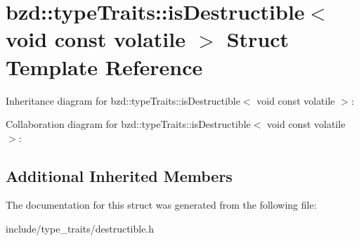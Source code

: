 \hypertarget{structbzd_1_1typeTraits_1_1isDestructible_3_01void_01const_01volatile_01_4}{}\section{bzd\+:\+:type\+Traits\+:\+:is\+Destructible$<$ void const volatile $>$ Struct Template Reference}
\label{structbzd_1_1typeTraits_1_1isDestructible_3_01void_01const_01volatile_01_4}


Inheritance diagram for bzd\+:\+:type\+Traits\+:\+:is\+Destructible$<$ void const volatile $>$\+:


Collaboration diagram for bzd\+:\+:type\+Traits\+:\+:is\+Destructible$<$ void const volatile $>$\+:
\subsection*{Additional Inherited Members}


The documentation for this struct was generated from the following file\+:\begin{DoxyCompactItemize}
\item 
include/type\+\_\+traits/destructible.\+h\end{DoxyCompactItemize}
